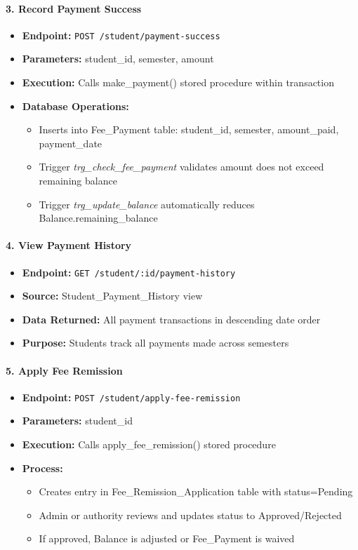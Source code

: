 \documentclass[12pt]{article}
\begin{document}
\paragraph{3. Record Payment Success}
\begin{itemize}
    \item \textbf{Endpoint:} \texttt{POST /student/payment-success}
    \item \textbf{Parameters:} student\_id, semester, amount
    \item \textbf{Execution:} Calls make\_payment() stored procedure within transaction
    \item \textbf{Database Operations:}
        \begin{itemize}
            \item Inserts into Fee\_Payment table: student\_id, semester, amount\_paid, payment\_date
            \item Trigger \textit{trg\_check\_fee\_payment} validates amount does not exceed remaining balance
            \item Trigger \textit{trg\_update\_balance} automatically reduces Balance.remaining\_balance
        \end{itemize}
\end{itemize}

\paragraph{4. View Payment History}
\begin{itemize}
    \item \textbf{Endpoint:} \texttt{GET /student/:id/payment-history}
    \item \textbf{Source:} Student\_Payment\_History view
    \item \textbf{Data Returned:} All payment transactions in descending date order
    \item \textbf{Purpose:} Students track all payments made across semesters
\end{itemize}

\paragraph{5. Apply Fee Remission}
\begin{itemize}
    \item \textbf{Endpoint:} \texttt{POST /student/apply-fee-remission}
    \item \textbf{Parameters:} student\_id
    \item \textbf{Execution:} Calls apply\_fee\_remission() stored procedure
    \item \textbf{Process:}
        \begin{itemize}
            \item Creates entry in Fee\_Remission\_Application table with status=Pending
            \item Admin or authority reviews and updates status to Approved/Rejected
            \item If approved, Balance is adjusted or Fee\_Payment is waived
        \end{itemize}
\end{itemize}
\end{document}
